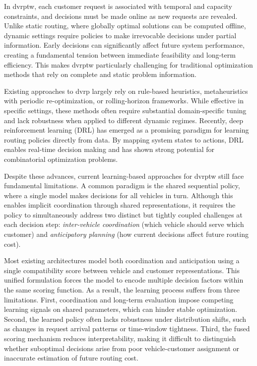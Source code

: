 \documentclass[conference]{IEEEtran}
\begin{document}
In \gls{dvrptw}, each customer request is associated with temporal and capacity constraints, and decisions must be made online as new requests are revealed. Unlike static routing, where globally optimal solutions can be computed offline, dynamic settings require policies to make irrevocable decisions under partial information. Early decisions can significantly affect future system performance, creating a fundamental tension between immediate feasibility and long-term efficiency. This makes \gls{dvrptw} particularly challenging for traditional optimization methods that rely on complete and static problem information.

Existing approaches to \gls{dvrp} largely rely on rule-based heuristics, metaheuristics with periodic re-optimization, or rolling-horizon frameworks. While effective in specific settings, these methods often require substantial domain-specific tuning and lack robustness when applied to different dynamic regimes. Recently, deep reinforcement learning (DRL) has emerged as a promising paradigm for learning routing policies directly from data. By mapping system states to actions, DRL enables real-time decision making and has shown strong potential for combinatorial optimization problems.

Despite these advances, current learning-based approaches for \gls{dvrptw} still face fundamental limitations. A common paradigm is the shared sequential policy, where a single model makes decisions for all vehicles in turn. Although this enables implicit coordination through shared representations, it requires the policy to simultaneously address two distinct but tightly coupled challenges at each decision step: \textit{inter-vehicle coordination} (which vehicle should serve which customer) and \textit{anticipatory planning} (how current decisions affect future routing cost). 

Most existing architectures model both coordination and anticipation using a single compatibility score between vehicle and customer representations. This unified formulation forces the model to encode multiple decision factors within the same scoring function. As a result, the learning process suffers from three limitations. First, coordination and long-term evaluation impose competing learning signals on shared parameters, which can hinder stable optimization. Second, the learned policy often lacks robustness under distribution shifts, such as changes in request arrival patterns or time-window tightness. Third, the fused scoring mechanism reduces interpretability, making it difficult to distinguish whether suboptimal decisions arise from poor vehicle-customer assignment or inaccurate estimation of future routing cost.
\end{document}
